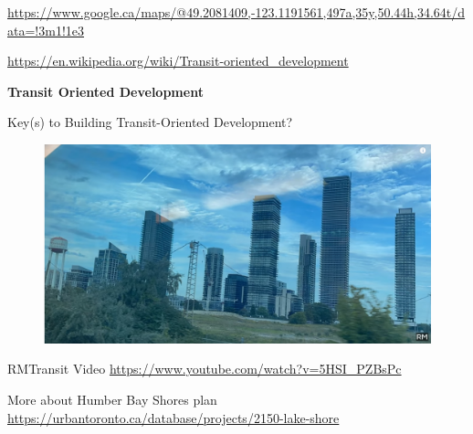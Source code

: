 \documentclass[aspectratio=169]{beamer}
\begin{document}
\begin{frame}
\begin{columns}
\begin{column}{0.5\textwidth}
		\end{column}
		
	\end{columns}

	\vspace{2mm}

	\tiny\url{https://www.google.ca/maps/@49.2081409,-123.1191561,497a,35y,50.44h,34.64t/data=!3m1!1e3}
	
	\tiny\url{https://en.wikipedia.org/wiki/Transit-oriented_development}
	
\end{frame}




\begin{frame}
	
	\textbf{Transit Oriented Development}
	
	\vspace{2mm}
	
	Key(s) to Building Transit-Oriented Development?
	
	\begin{figure}
		\centering
		\includegraphics[width=0.7\linewidth]{images/humber_bay.png}
	\end{figure}
		
	
	\tiny 
	RMTransit
	 Video \url{https://www.youtube.com/watch?v=5HSI_PZBsPc}
	
	\vspace{2mm}
	
	\tiny More about Humber Bay Shores plan \url{https://urbantoronto.ca/database/projects/2150-lake-shore}
	
\end{frame}
\end{document}

